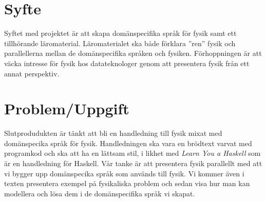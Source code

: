 \documentclass[12pt,a4paper]{article}
\begin{document}
% 
% 
% 

\section{Syfte}

Syftet med projektet är att skapa domänspecifika språk för fysik samt ett tillhörande läromaterial. Läromaterialet ska både förklara ''ren'' fysik och parallellerna mellan de domänspecifika språken och fysiken. Förhoppningen är att väcka intresse för fysik hos datateknologer genom att presentera fysik från ett annat perspektiv.

%

\section{Problem/Uppgift}

Slutprodudukten är tänkt att bli en handledning till fysik mixat med domänspecika språk för fysik. Handledningen ska vara en brödtext varvat med programkod och ska att ha en lättsam stil, i likhet med \textit{Learn You a Haskell}\cite{LYAH} som är en handledning för Haskell. Vår tanke är att presentera fysik parallellt med att vi bygger upp domänspecika språk som används till fysik. Vi kommer även i texten presentera exempel på fysikaliska problem och sedan visa hur man kan modellera och lösa dem i de domänspecifika språk vi skapat.
\end{document}
